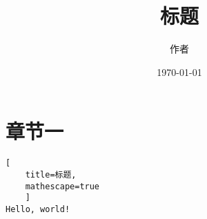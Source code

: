 \documentclass[UTF8]{ctexart}
\title{标题}
\author{作者}
\date{\today}
\begin{document}
\maketitle

\newpage

\section{章节一}

\begin{lstlisting}[
    title=标题,
    mathescape=true
    ]
Hello, world!
\end{lstlisting}

\newpage
\end{document}

